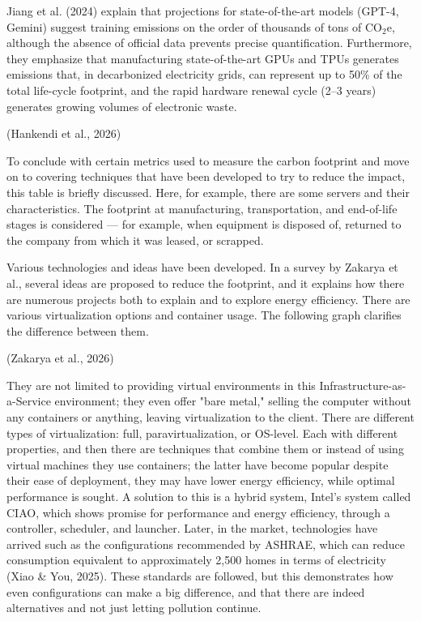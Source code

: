 \documentclass[conference]{IEEEtran}
\begin{document}
Jiang et al. (2024) explain that projections for state-of-the-art models (GPT-4, Gemini) suggest training emissions on the order of thousands of tons of CO$_2$e, although the absence of official data prevents precise quantification. Furthermore, they emphasize that manufacturing state-of-the-art GPUs and TPUs generates emissions that, in decarbonized electricity grids, can represent up to 50\% of the total life-cycle footprint, and the rapid hardware renewal cycle (2–3 years) generates growing volumes of electronic waste.

(Hankendi et al., 2026)

To conclude with certain metrics used to measure the carbon footprint and move on to covering techniques that have been developed to try to reduce the impact, this table is briefly discussed. Here, for example, there are some servers and their characteristics. The footprint at manufacturing, transportation, and end-of-life stages is considered — for example, when equipment is disposed of, returned to the company from which it was leased, or scrapped.

Various technologies and ideas have been developed. In a survey by Zakarya et al., several ideas are proposed to reduce the footprint, and it explains how there are numerous projects both to explain and to explore energy efficiency. There are various virtualization options and container usage. The following graph clarifies the difference between them.

(Zakarya et al., 2026)

They are not limited to providing virtual environments in this Infrastructure-as-a-Service environment; they even offer "bare metal," selling the computer without any containers or anything, leaving virtualization to the client. There are different types of virtualization: full, paravirtualization, or OS-level. Each with different properties, and then there are techniques that combine them or instead of using virtual machines they use containers; the latter have become popular despite their ease of deployment, they may have lower energy efficiency, while optimal performance is sought. A solution to this is a hybrid system, Intel's system called CIAO, which shows promise for performance and energy efficiency, through a controller, scheduler, and launcher. Later, in the market, technologies have arrived such as the configurations recommended by ASHRAE, which can reduce consumption equivalent to approximately 2,500 homes in terms of electricity (Xiao \& You, 2025). These standards are followed, but this demonstrates how even configurations can make a big difference, and that there are indeed alternatives and not just letting pollution continue.
\end{document}
